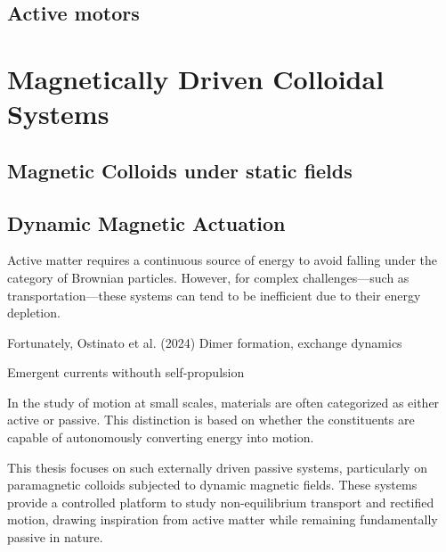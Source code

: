 \section{Active motors}


\chapter{Magnetically Driven Colloidal Systems}
\label{magneticallydrivencolloidalsystems}

\section{Magnetic Colloids under static fields}

\section{Dynamic Magnetic Actuation}

Active matter requires a continuous source of energy to avoid falling under the category of Brownian particles. However, for complex challenges—such as transportation—these systems can tend to be inefficient due to their energy depletion.

Fortunately, Ostinato et al. (2024)
Dimer formation, exchange dynamics

Emergent currents withouth self-propulsion

In the study of motion at small scales, materials are often categorized as either active or passive. This distinction is based on whether the constituents are capable of autonomously converting energy into motion.


This thesis focuses on such externally driven passive systems, particularly on paramagnetic colloids subjected to dynamic magnetic fields. These systems provide a controlled platform to study non-equilibrium transport and rectified motion, drawing inspiration from active matter while remaining fundamentally passive in nature.

\newpage
